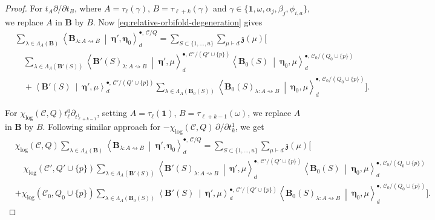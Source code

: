 \documentclass[letterpaper,12pt]{amsart}
\theoremstyle{definition}
\newcommand{\id}{\mathbf 1}
\newcommand{\cC}{\mathcal C}
\numberwithin{equation}{section}
\begin{document}
\begin{proof}
For \(t_A\partial/\partial t_B\), where \(A=\tau_\ell(\gamma)\), \(B=\tau_{\ell+k}(\gamma)\) and
\(\gamma\in\{\id,\omega,\alpha_j,\beta_j,\phi_{i,a}\}\), we replace
\(A\) in \(\mathbf B\) by \(B\).  Now \eqref{eq:relative-orbifold-degeneration} gives
\[
\begin{aligned}
&\sum_{\lambda\in\Lambda_A(\mathbf B)}
 \left\langle\mathbf B_{\lambda:A\rightsquigarrow B}
 \ \middle|\ \boldsymbol\eta',\boldsymbol\eta_0\right\rangle_d^{\bullet,\,\cC/Q}
={}\sum_{S\subset\{1,\ldots,u\}}\sum_{\mu\vdash d}\mathfrak z(\mu)\Bigg[
\\[-2mm]
&\quad\sum_{\lambda\in\Lambda_A(\mathbf B'(S))}
 \left\langle\mathbf B'(S)_{\lambda:A\rightsquigarrow B}
 \ \middle|\ \boldsymbol\eta',\mu\right\rangle_d^{\bullet,\,\cC'/(Q'\cup\{p\})}
 \left\langle\mathbf B_0(S)\ \middle|\ \boldsymbol\eta_0,\mu\right\rangle_d^{\bullet,\,\cC_0/(Q_0\cup\{p\})}
\\[-1mm]
&\quad+\left\langle\mathbf B'(S)\ \middle|\ \boldsymbol\eta',\mu\right\rangle_d^{\bullet,\,\cC'/(Q'\cup\{p\})}
 \sum_{\lambda\in\Lambda_A(\mathbf B_0(S))}
 \left\langle\mathbf B_0(S)_{\lambda:A\rightsquigarrow B}
 \ \middle|\ \boldsymbol\eta_0,\mu\right\rangle_d^{\bullet,\,\cC_0/(Q_0\cup\{p\})}\Bigg].
\end{aligned}
\]

For \(\chi_{\log}(\cC,Q)t^0_\ell\partial_{t^1_{\ell+k-1}}\), setting
\(A=\tau_\ell(\id)\), \(B=\tau_{\ell+k-1}(\omega)\), we replace \(A\) in $\mathbf B$ by \(B\).
Following similar approach for \(-\chi_{\log}(\cC,Q)\,\partial/\partial t^1_k\), we get
\[
\begin{aligned}
&\chi_{\log}(\cC,Q)\sum_{\lambda\in\Lambda_A(\mathbf B)}
 \left\langle\mathbf B_{\lambda:A\rightsquigarrow B}
 \ \middle|\ \boldsymbol\eta',\boldsymbol\eta_0\right\rangle_d^{\bullet,\,\cC/Q}
={}\sum_{S\subset\{1,\ldots,u\}}\sum_{\mu\vdash d}\mathfrak z(\mu)\Bigg[
\\[-2mm]
&\quad\chi_{\log}(\cC',Q'\cup\{p\})
 \sum_{\lambda\in\Lambda_A(\mathbf B'(S))}
 \left\langle\mathbf B'(S)_{\lambda:A\rightsquigarrow B}
 \ \middle|\ \boldsymbol\eta',\mu\right\rangle_d^{\bullet,\,\cC'/(Q'\cup\{p\})}
 \left\langle\mathbf B_0(S)\ \middle|\ \boldsymbol\eta_0,\mu\right\rangle_d^{\bullet,\,\cC_0/(Q_0\cup\{p\})}
\\[-2mm]
&+\chi_{\log}(\cC_0,Q_0\cup\{p\})
 \sum_{\lambda\in\Lambda_A(\mathbf B_0(S))}
 \left\langle\mathbf B'(S)\ \middle|\ \boldsymbol\eta',\mu\right\rangle_d^{\bullet,\,\cC'/(Q'\cup\{p\})}
 \left\langle\mathbf B_0(S)_{\lambda:A\rightsquigarrow B}
 \ \middle|\ \boldsymbol\eta_0,\mu\right\rangle_d^{\bullet,\,\cC_0/(Q_0\cup\{p\})}\Bigg].
\end{aligned}
\]



\end{proof}
\end{document}
